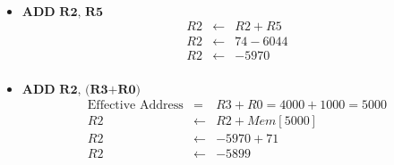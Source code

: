 \documentclass{tufte-handout}
\begin{document}
\begin{itemize}
		\item $\textbf{ADD R2, R5}$
			\begin{eqnarray*}
				R2 &\leftarrow& R2 + R5 \\
				R2 &\leftarrow& 74 - 6044 \\
				R2 &\leftarrow& -5970 \\
			\end{eqnarray*}

		\item $\textbf{ADD R2, (R3+R0)}$
			\begin{eqnarray*}
				\mbox{Effective Address} &=& R3 + R0 = 4000 + 1000 = 5000 \\
				R2 &\leftarrow& R2 + Mem[5000] \\
				R2 &\leftarrow& -5970 + 71 \\
				R2 &\leftarrow& -5899 \\
			\end{eqnarray*}

	\end{itemize}

		
  
  
  
  
\end{document}
